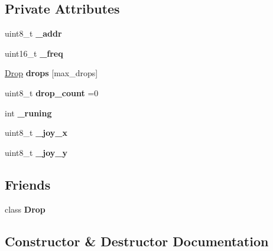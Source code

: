 \subsection*{Private Attributes}
\begin{DoxyCompactItemize}
\item 
\mbox{\label{class_open_drop_a1bfed56abe74c90a3ddaa97191239add}} 
uint8\+\_\+t {\bfseries \+\_\+addr}
\item 
\mbox{\label{class_open_drop_ae83e4ff0a3dbc88d48f4e3663aa877b3}} 
uint16\+\_\+t {\bfseries \+\_\+freq}
\item 
\mbox{\label{class_open_drop_afbba6fac2d2e521ec46d4046831424a4}} 
\mbox{\hyperlink{class_drop}{Drop}} {\bfseries drops} \mbox{[}max\+\_\+drops\mbox{]}
\item 
\mbox{\label{class_open_drop_a8ec8b5cfebfe67dd27fa9d1266dffcbe}} 
uint8\+\_\+t {\bfseries drop\+\_\+count} =0
\item 
\mbox{\label{class_open_drop_aaa998879ae3a73163bce630b95a8eed7}} 
int {\bfseries \+\_\+runing}
\item 
\mbox{\label{class_open_drop_ac6670ad856ca681f67627c959ab4b1b5}} 
uint8\+\_\+t {\bfseries \+\_\+joy\+\_\+x}
\item 
\mbox{\label{class_open_drop_a3e37a31f0b88d37a01004ba27918f3a1}} 
uint8\+\_\+t {\bfseries \+\_\+joy\+\_\+y}
\end{DoxyCompactItemize}
\subsection*{Friends}
\begin{DoxyCompactItemize}
\item 
\mbox{\label{class_open_drop_ad9604a1a8e4484b9414e946d27245c74}} 
class {\bfseries Drop}
\end{DoxyCompactItemize}


\subsection{Constructor \& Destructor Documentation}
\mbox{\label{class_open_drop_a788cd7194b7248a39453ab99168639ec}} 
